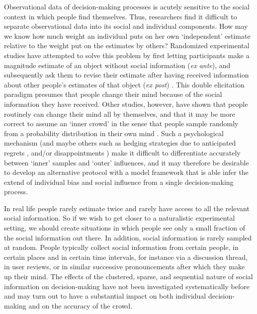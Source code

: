 \documentclass[9pt,twocolumn,twoside,lineno]{pnas-new}
\begin{document}
Observational data of decision-making processes is acutely sensitive to the social context in which people find themselves. Thus, researchers find it difficult to separate observational data into its social and individual components. How may we know how much weight an individual puts on her own ‘independent’ estimate relative to the weight put on the estimates by others? Randomized experimental studies have attempted to solve this problem by first letting participants make a magnitude estimate of an object without social information (\textit{ex ante}), and subsequently ask them to revise their estimate after having received information about other people’s estimates of that object (\textit{ex post}) \cite{becker2017network, jayles2017social, lorenz2011social, sniezek1995cueing, mavrodiev2013quantifying}. This double elicitation paradigm presumes that people change their mind because of the social information they have received. Other studies, however, have shown that people routinely can change their mind all by themselves, and that it may be more correct to assume an `inner crowd' in the sense that people sample randomly from a probability distribution in their own mind \cite{vul2008measuring, herzog2009wisdom, herzog2014harnessing}. Such a psychological mechanism (and maybe others such as hedging strategies due to anticipated regrets \cite{bell1982regret}, and/or disappointments \cite{loomes1986disappointment}) make it difficult to differentiate accurately between `inner' samples and `outer' influences, and it may therefore be desirable to develop an alternative protocol with a model framework that is able infer the extend of individual bias and social influence from a single decision-making process.   

In real life people rarely estimate twice and rarely have access to all the relevant social information. So if we wish to get closer to a naturalistic experimental setting, we should create situations in which people see only a small fraction of the social information out there. In addition, social information is rarely sampled at random. People typically collect social information from certain people, in certain places and in certain time intervals, for instance via a discussion thread, in user reviews, or in similar successive pronouncements after which they make up their mind. The effects of the clustered, sparse, and sequential nature of social information on decision-making have not been investigated systematically before and may turn out to have a substantial impact on both individual decision-making and on the accuracy of the crowd. 
\end{document}
